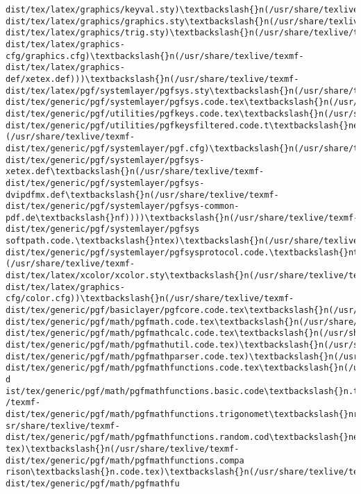 \documentclass[11pt]{article}
\begin{document}
\begin{Verbatim}[commandchars=\\\{\}]
dist/tex/latex/graphics/keyval.sty)\textbackslash{}n(/usr/share/texlive/texmf-
dist/tex/latex/graphics/graphics.sty\textbackslash{}n(/usr/share/texlive/texmf-
dist/tex/latex/graphics/trig.sty)\textbackslash{}n(/usr/share/texlive/texmf-
dist/tex/latex/graphics-cfg/graphics.cfg)\textbackslash{}n(/usr/share/texlive/texmf-
dist/tex/latex/graphics-def/xetex.def)))\textbackslash{}n(/usr/share/texlive/texmf-
dist/tex/latex/pgf/systemlayer/pgfsys.sty\textbackslash{}n(/usr/share/texlive/texmf-
dist/tex/generic/pgf/systemlayer/pgfsys.code.tex\textbackslash{}n(/usr/share/texlive/texmf-
dist/tex/generic/pgf/utilities/pgfkeys.code.tex\textbackslash{}n(/usr/share/texlive/texmf-
dist/tex/generic/pgf/utilities/pgfkeysfiltered.code.t\textbackslash{}nex))
(/usr/share/texlive/texmf-
dist/tex/generic/pgf/systemlayer/pgf.cfg)\textbackslash{}n(/usr/share/texlive/texmf-
dist/tex/generic/pgf/systemlayer/pgfsys-xetex.def\textbackslash{}n(/usr/share/texlive/texmf-
dist/tex/generic/pgf/systemlayer/pgfsys-dvipdfmx.def\textbackslash{}n(/usr/share/texlive/texmf-
dist/tex/generic/pgf/systemlayer/pgfsys-common-
pdf.de\textbackslash{}nf))))\textbackslash{}n(/usr/share/texlive/texmf-dist/tex/generic/pgf/systemlayer/pgfsys
softpath.code.\textbackslash{}ntex)\textbackslash{}n(/usr/share/texlive/texmf-
dist/tex/generic/pgf/systemlayer/pgfsysprotocol.code.\textbackslash{}ntex))
(/usr/share/texlive/texmf-
dist/tex/latex/xcolor/xcolor.sty\textbackslash{}n(/usr/share/texlive/texmf-
dist/tex/latex/graphics-cfg/color.cfg))\textbackslash{}n(/usr/share/texlive/texmf-
dist/tex/generic/pgf/basiclayer/pgfcore.code.tex\textbackslash{}n(/usr/share/texlive/texmf-
dist/tex/generic/pgf/math/pgfmath.code.tex\textbackslash{}n(/usr/share/texlive/texmf-
dist/tex/generic/pgf/math/pgfmathcalc.code.tex\textbackslash{}n(/usr/share/texlive/texmf-
dist/tex/generic/pgf/math/pgfmathutil.code.tex)\textbackslash{}n(/usr/share/texlive/texmf-
dist/tex/generic/pgf/math/pgfmathparser.code.tex)\textbackslash{}n(/usr/share/texlive/texmf-
dist/tex/generic/pgf/math/pgfmathfunctions.code.tex\textbackslash{}n(/usr/share/texlive/texmf-d
ist/tex/generic/pgf/math/pgfmathfunctions.basic.code\textbackslash{}n.tex)\textbackslash{}n(/usr/share/texlive
/texmf-dist/tex/generic/pgf/math/pgfmathfunctions.trigonomet\textbackslash{}nric.code.tex)\textbackslash{}n(/u
sr/share/texlive/texmf-dist/tex/generic/pgf/math/pgfmathfunctions.random.cod\textbackslash{}ne.
tex)\textbackslash{}n(/usr/share/texlive/texmf-dist/tex/generic/pgf/math/pgfmathfunctions.compa
rison\textbackslash{}n.code.tex)\textbackslash{}n(/usr/share/texlive/texmf-dist/tex/generic/pgf/math/pgfmathfu

\end{Verbatim}
\end{document}
